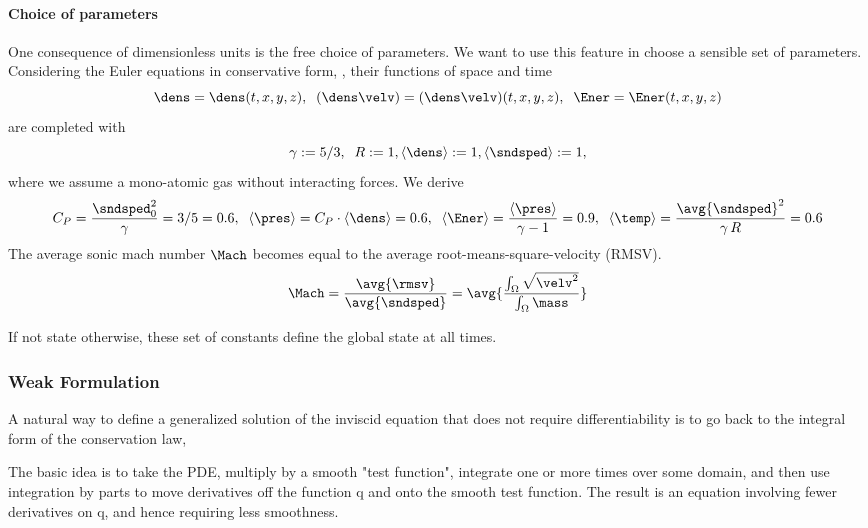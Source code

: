 \paragraph{Choice of parameters} One consequence of dimensionless units is the free
choice of parameters. We want to use this feature in choose a sensible set of parameters.
Considering the Euler equations in conservative form, , their functions
of space and time
\begin{equation}
\dens = \dens(t,x,y,z), \;\;(\dens\velv) = (\dens\velv)(t,x,y,z),\;\;\Ener = \Ener(t,x,y,z)
\end{equation}
are completed with
\begin{equation}
\gamma := 5/3,\;\;R := 1, \langle\dens\rangle := 1,\langle\sndsped\rangle := 1,
\end{equation}
where we assume a mono-atomic gas without interacting forces. We derive
\begin{equation}
C_P = \frac{\sndsped_0^2}{\gamma} = 3/5 = 0.6,\;\;
\langle\pres\rangle = C_P\cdot\langle\dens\rangle = 0.6,\;\;
\langle\Ener\rangle = \frac{\langle\pres\rangle}{\gamma -1} = 0.9,\;\;
\langle\temp\rangle = \frac{\avg{\sndsped}^2}{\gamma\,R} = 0.6
\end{equation}
\remark The average sonic mach number $\Mach$ becomes equal to the
average root-means-square-velocity (RMSV).
\begin{equation}
\Mach = \frac{\avg{\rmsv}}{\avg{\sndsped}} = \avg{\frac{\int_\Omega \sqrt{\velv^2}}{\int_\Omega \mass}}
\end{equation}

If not state otherwise, these set of constants define the global state at all times.

\subsubsection{Weak Formulation}

A natural way to define a generalized solution of
the inviscid equation that does not require differentiability is to go back to
the integral form of the conservation law,

The basic idea is to
take the PDE, multiply by a smooth "test function", integrate one or more
times over some domain, and then use integration by parts to move derivatives
off the function q and onto the smooth test function. The result is an equation
involving fewer derivatives on q, and hence requiring less smoothness.

